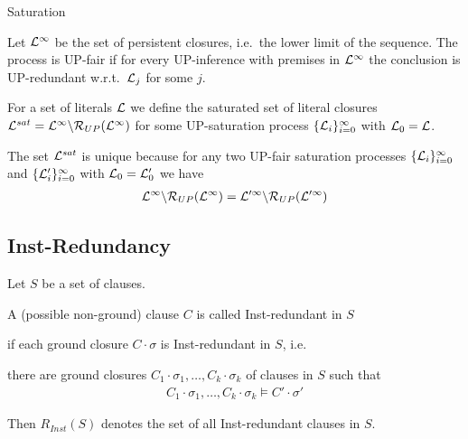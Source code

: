 \documentclass[%
handout,
]{beamer}
\begin{document}
\begin{frame}[allowframebreaks]{Saturation}
    \begin{definition}
        Let \( \mathcal{L}^\infty \) be the set of persistent closures,
        i.e.~the lower limit of the sequence.
        The process is {UP-fair} if for every UP-inference
        with premises in \( \mathcal{L}^\infty \) the conclusion is UP-redundant
        w.r.t.~\(\mathcal{L}_j\) for some \(j\).

        For a set of literals \( \mathcal{L} \) we define
        the saturated set of literal closures
        \( \mathcal{L}^{sat} = \mathcal{L}^\infty\backslash\mathcal{R}_{UP}(\mathcal{L}^\infty) \)
        for some UP-saturation process
        \( \{ \mathcal{L}_i\}_{i=0}^\infty \)
        with $\mathcal{L}_0 = \mathcal{L}$.
    \end{definition}

    \begin{lemma}
        The set \( \mathcal{L}^{sat} \) is unique because
        for any two UP-fair saturation processes
        \(\{ \mathcal{L}_i
            \}_{i=0}^\infty\) and
            \(\{ \mathcal{L}'_i
            \}_{i=0}^\infty\)
            with $\mathcal{L}_0 = \mathcal{L}'_0$ we have
            \begin{gather*}
                \mathcal{L}^\infty \backslash \mathcal{R}_{UP}(\mathcal{L}^\infty)
                =
                \mathcal{L}'^\infty \backslash \mathcal{R}_{UP}(\mathcal{L}'^\infty)
            \end{gather*}
    \end{lemma}
\end{frame}

\subsection{Inst-Redundancy}

\begin{frame}


Let $S$ be a set of clauses.

A (possible non-ground) clause $C$ is called Inst-redundant in $S$

if each ground closure $C\cdot\sigma$ is Inst-redundant in $S$, i.e.

there are ground closures $C_1\cdot\sigma_1,\ldots,C_k\cdot\sigma_k$ of clauses in $S$ such that
\begin{gather*}
    C_1\cdot\sigma_1,\ldots,C_k\cdot\sigma_k\models C'\cdot\sigma'
\end{gather*}

\vspace{1.4em}
Then $R_{Inst}(S)$ denotes the set of all Inst-redundant clauses in $S$.

\end{frame}
\end{document}
